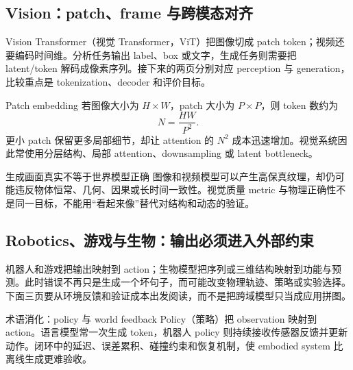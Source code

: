 \subsection{Vision：patch、frame 与跨模态对齐}

Vision Transformer（视觉 Transformer，ViT）把图像切成 patch token；视频还要编码时间维。分析任务输出 label、box 或文字，生成任务则需要把 latent/token 解码成像素序列。接下来的两页分别对应 perception 与 generation，比较重点是 tokenization、decoder 和评价目标。


\begin{importantbox}{Patch embedding}
若图像大小为 $H\times W$，patch 大小为 $P\times P$，则 token 数约为
\[
N=\frac{HW}{P^2}.
\]
更小 patch 保留更多局部细节，却让 attention 的 $N^2$ 成本迅速增加。视觉系统因此常使用分层结构、局部 attention、downsampling 或 latent bottleneck。
\end{importantbox}


\begin{warningbox}{生成画面真实不等于世界模型正确}
图像和视频模型可以产生高保真纹理，却仍可能违反物体恒常、几何、因果或长时间一致性。视觉质量 metric 与物理正确性不是同一目标，不能用“看起来像”替代对结构和动态的验证。
\end{warningbox}

\subsection{Robotics、游戏与生物：输出必须进入外部约束}

机器人和游戏把输出映射到 action；生物模型把序列或三维结构映射到功能与预测。此时错误不再只是生成一个坏句子，而可能改变物理轨迹、策略或实验选择。下面三页要从环境反馈和验证成本出发阅读，而不是把跨域模型只当成应用拼图。


\begin{knowledgebox}{术语消化：policy 与 world feedback}
Policy（策略）把 observation 映射到 action。语言模型常一次生成 token，机器人 policy 则持续接收传感器反馈并更新动作。闭环中的延迟、误差累积、碰撞约束和恢复机制，使 embodied system 比离线生成更难验收。
\end{knowledgebox}


